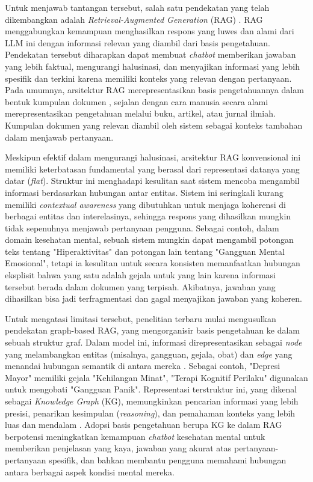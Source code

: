 Untuk menjawab tantangan tersebut, salah satu pendekatan yang telah dikembangkan adalah \textit{Retrieval-Augmented Generation} (RAG) \cite{Lewis2021RAGKnowledgeIntensiveNLP}.
RAG menggabungkan kemampuan menghasilkan respons yang luwes dan alami dari LLM ini dengan informasi relevan yang diambil dari basis pengetahuan.
Pendekatan tersebut diharapkan dapat membuat \textit{chatbot} memberikan jawaban yang lebih faktual, mengurangi halusinasi, dan menyajikan informasi yang lebih spesifik dan terkini karena memiliki konteks yang relevan dengan pertanyaan.
Pada umumnya, arsitektur RAG merepresentasikan basis pengetahuannya dalam bentuk kumpulan dokumen \cite{Lewis2021RAGKnowledgeIntensiveNLP}, sejalan dengan cara manusia secara alami merepresentasikan pengetahuan melalui buku, artikel, atau jurnal ilmiah.
Kumpulan dokumen yang relevan diambil oleh sistem sebagai konteks tambahan dalam menjawab pertanyaan.

Meskipun efektif dalam mengurangi halusinasi, arsitektur RAG konvensional ini memiliki keterbatasan fundamental yang berasal dari representasi datanya yang datar (\textit{flat}).
Struktur ini menghadapi kesulitan saat sistem mencoba mengambil informasi berdasarkan hubungan antar entitas.
Sistem ini seringkali kurang memiliki \textit{ contextual awareness} yang dibutuhkan untuk menjaga koherensi di berbagai entitas dan interelasinya, sehingga respons yang dihasilkan mungkin tidak sepenuhnya menjawab pertanyaan pengguna.
Sebagai contoh, dalam domain kesehatan mental, sebuah sistem mungkin dapat mengambil potongan teks tentang "Hiperaktivitas" dan potongan lain tentang "Gangguan Mental Emosional", tetapi ia kesulitan untuk secara konsisten memanfaatkan hubungan eksplisit bahwa yang satu adalah gejala untuk yang lain karena informasi tersebut berada dalam dokumen yang terpisah.
Akibatnya, jawaban yang dihasilkan bisa jadi terfragmentasi dan gagal menyajikan jawaban yang koheren.

Untuk mengatasi limitasi tersebut, penelitian terbaru mulai mengusulkan pendekatan graph-based RAG, yang mengorganisir basis pengetahuan ke dalam sebuah struktur graf.
Dalam model ini, informasi direpresentasikan sebagai \textit{node} yang melambangkan entitas (misalnya, gangguan, gejala, obat) dan \textit{edge} yang menandai hubungan semantik di antara mereka \cite{Chen2020ReviewKnowldgeReasoningOverKnowledgeGraph}.
Sebagai contoh, "Depresi Mayor" memiliki gejala "Kehilangan Minat", "Terapi Kognitif Perilaku" digunakan untuk mengobati "Gangguan Panik".
Representasi terstruktur ini, yang dikenal sebagai \textit{Knowledge Graph} (KG), memungkinkan pencarian informasi yang lebih presisi, penarikan kesimpulan (\textit{reasoning}), dan pemahaman konteks yang lebih luas dan mendalam \cite{Chen2020ReviewKnowldgeReasoningOverKnowledgeGraph}.
Adopsi basis pengetahuan berupa KG ke dalam RAG berpotensi meningkatkan kemampuan \textit{chatbot} kesehatan mental untuk memberikan penjelasan yang kaya, jawaban yang akurat atas pertanyaan-pertanyaan spesifik, dan bahkan membantu pengguna memahami hubungan antara berbagai aspek kondisi mental mereka.

